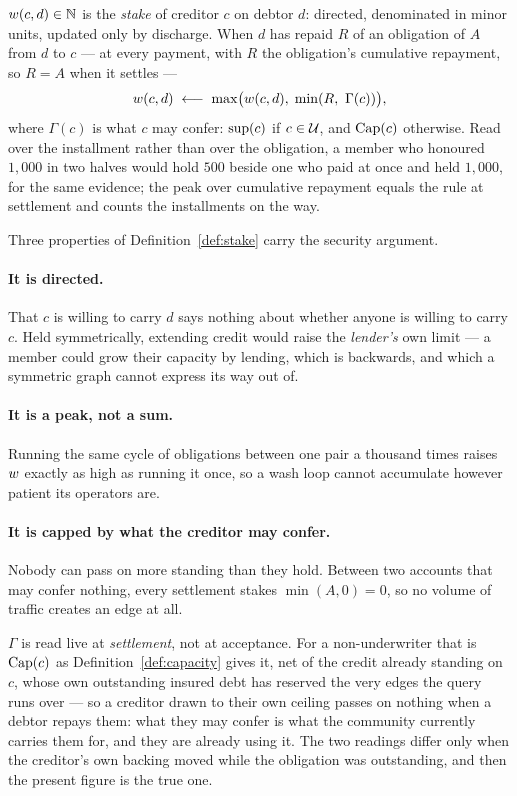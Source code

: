 \begin{definition}[Stake]
\label{def:stake}
$w(c,d)\in\mathbb{N}$ is the \emph{stake} of creditor $c$ on debtor $d$: directed,
denominated in minor units, updated only by discharge. When $d$ has repaid $R$ of an
obligation of $A$ from $d$ to $c$ --- at every payment, with $R$ the obligation's
cumulative repayment, so $R = A$ when it settles ---
\[
  \stake(c,d) \;\longleftarrow\; \max\!\big(\stake(c,d),\; \min(R,\ \Gamma(c))\big),
\]
where $\Gamma(c)$ is what $c$ may confer: $\mathrm{sup}(c)$ if $c\in\mathcal{U}$, and $\mathrm{Cap}(c)$
otherwise. Read over the installment rather than over the obligation, a member who honoured
$1{,}000$ in two halves would hold $500$ beside one who paid at once and held $1{,}000$,
for the same evidence; the peak over cumulative repayment equals the rule at settlement
and counts the installments on the way.
\end{definition}

Three properties of Definition~\ref{def:stake} carry the security argument.

\paragraph{It is directed.} That $c$ is willing to carry $d$ says nothing about whether
anyone is willing to carry $c$. Held symmetrically, extending credit would raise the
\emph{lender's} own limit --- a member could grow their capacity by lending, which is
backwards, and which a symmetric graph cannot express its way out of.

\paragraph{It is a peak, not a sum.} Running the same cycle of obligations between one
pair a thousand times raises $w$ exactly as high as running it once, so a wash loop
cannot accumulate however patient its operators are.

\paragraph{It is capped by what the creditor may confer.} Nobody can pass on more
standing than they hold. Between two accounts that may confer nothing, every settlement
stakes $\min(A,0)=0$, so no volume of traffic creates an edge at all.

$\Gamma$ is read live at \emph{settlement}, not at acceptance. For a non-underwriter that
is $\mathrm{Cap}(c)$ as Definition~\ref{def:capacity} gives it, net of the credit already
standing on $c$, whose own outstanding insured debt has reserved the very edges the query
runs over --- so a creditor drawn to their own ceiling passes on nothing when a debtor
repays them: what they may confer is what the community currently carries them for, and
they are already using it. The two readings differ only when the creditor's own backing
moved while the obligation was outstanding, and then the present figure is the true one.

